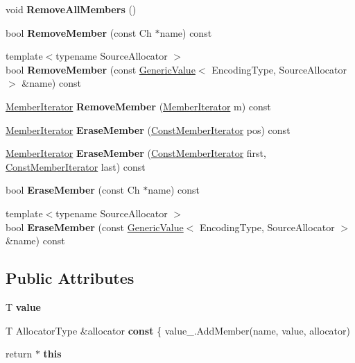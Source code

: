 \begin{DoxyCompactItemize}
\item 
\mbox{\label{a02080_a129ce3843a6658e620a7f740d9f44ee1}} 
void {\bfseries Remove\+All\+Members} ()
\item 
\mbox{\label{a02080_aebeda9c2cac6afd56dda55caaf2c4a0c}} 
bool {\bfseries Remove\+Member} (const Ch $\ast$name) const
\item 
\mbox{\label{a02080_a8e29dc07b992e71e35dd93a57f95842c}} 
{\footnotesize template$<$typename Source\+Allocator $>$ }\\bool {\bfseries Remove\+Member} (const \hyperlink{a01992}{Generic\+Value}$<$ Encoding\+Type, Source\+Allocator $>$ \&name) const
\item 
\mbox{\label{a02080_a006f76a33dada85c9d13e069cc43623d}} 
\hyperlink{a02004}{Member\+Iterator} {\bfseries Remove\+Member} (\hyperlink{a02004}{Member\+Iterator} m) const
\item 
\mbox{\label{a02080_a29ad0490a4a088d57df7a9884f979a82}} 
\hyperlink{a02004}{Member\+Iterator} {\bfseries Erase\+Member} (\hyperlink{a02004}{Const\+Member\+Iterator} pos) const
\item 
\mbox{\label{a02080_a67f85d2da462287dead8e35f2ac974b5}} 
\hyperlink{a02004}{Member\+Iterator} {\bfseries Erase\+Member} (\hyperlink{a02004}{Const\+Member\+Iterator} first, \hyperlink{a02004}{Const\+Member\+Iterator} last) const
\item 
\mbox{\label{a02080_af0d31a8547051624449494a339b20107}} 
bool {\bfseries Erase\+Member} (const Ch $\ast$name) const
\item 
\mbox{\label{a02080_a4cd6f90444f20cc9d5577747d3968da4}} 
{\footnotesize template$<$typename Source\+Allocator $>$ }\\bool {\bfseries Erase\+Member} (const \hyperlink{a01992}{Generic\+Value}$<$ Encoding\+Type, Source\+Allocator $>$ \&name) const
\end{DoxyCompactItemize}
\subsection*{Public Attributes}
\begin{DoxyCompactItemize}
\item 
\mbox{\label{a02080_a131538fbbacbc0a3a5ad15dbea66394f}} 
T {\bfseries value}
\item 
\mbox{\label{a02080_af70c9646b5e422306c33e98b3d8783a7}} 
T Allocator\+Type \&allocator {\bfseries const} \{ value\+\_\+.\+Add\+Member(name, value, allocator)
\item 
\mbox{\label{a02080_a719a0e5501da825e6f86ce12b46446cb}} 
return $\ast$ {\bfseries this}
\end{DoxyCompactItemize}
